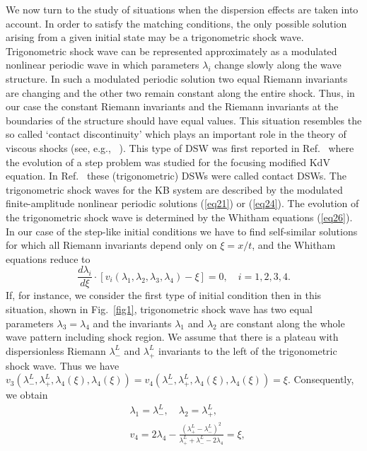 \documentclass[pre,aps,superscriptaddress,twocolumn,floatfix]{revtex4-1}
\newcommand{\la}{\lambda}
\begin{document}
We now turn to the study of situations when the dispersion effects are taken into account. In order to
satisfy the matching conditions, the only possible solution arising from a given initial
state may be a trigonometric shock wave. Trigonometric shock wave can be represented
approximately as a modulated nonlinear periodic wave in which parameters $\lambda_i$
change slowly along the wave structure. In such a modulated periodic solution two equal Riemann invariants are changing and the other two remain constant along the entire shock.
Thus, in our case the constant Riemann invariants and the Riemann invariants at the boundaries
of the structure should have equal values. This situation resembles the so called
`contact discontinuity' which plays an important role in the theory of viscous shocks
(see, e.g., ~\cite{LL-6}). This type of DSW was first reported in Ref.~\cite{Marchant-08} where
the evolution of a step problem was studied for the focusing modified KdV equation.
In Ref.~\cite{ElHoeferShearer-17} these (trigonometric) DSWs were called contact DSWs.
The trigonometric shock waves for the KB system are described by the modulated finite-amplitude
nonlinear periodic solutions (\ref{eq21}) or (\ref{eq24}). The evolution of the trigonometric
shock wave is determined by the Whitham equations (\ref{eq26}). In our case of the step-like
initial conditions we have to find self-similar solutions for which all Riemann invariants
depend only on $\xi = x/t$, and the Whitham equations reduce to
\begin{equation}\label{eq35}
\frac{d\la_i}{d\xi}\cdot
\left[v_i(\la_1,\la_2,\la_3,\la_4)-\xi\right]=0,\quad i=1,2,3,4.
\end{equation}
If, for instance, we consider the first type of initial condition then in this situation,
shown in Fig.~\ref{fig1}, trigonometric shock wave has two equal parameters
$\lambda_3=\lambda_4$ and the invariants $\la_1$ and $\la_2$ are constant along
the whole wave pattern including shock region. We assume that there is a plateau with
dispersionless Riemann $\la_-^L$ and $\la_+^L$ invariants to the left of the
trigonometric shock wave. Thus we have
$v_3(\la_-^L,\la_+^L, \lambda_4(\xi),\lambda_4(\xi)) = v_4(\la_-^L,\la_+^L,
\lambda_4(\xi),\lambda_4(\xi))=\xi$. Consequently, we obtain
\begin{equation}\label{}
\begin{split}
& \lambda_1=\lambda_-^L, \quad \lambda_2=\lambda_+^L,\\
& v_4=2\lambda_4-\frac{(\lambda_+^L-\lambda_-^L)^2}{\lambda_+^L+\lambda_-^L-2\lambda_4}=\xi,
\end{split}
\end{equation}
\end{document}
